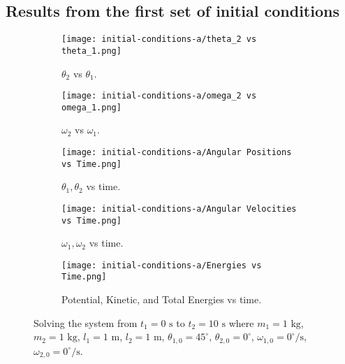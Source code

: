 \subsection{Results from the first set of initial conditions}\label{subsec:results-from-the-first-set-of-initial-conditions}
\begin{figure}[H]
    \centering
    \begin{subfigure}[b]{0.49\textwidth}
        \centering
        \texttt{[image: initial-conditions-a/theta\_2 vs theta\_1.png]}
        \caption{$\theta_2$ vs $\theta_1$.}
        \label{fig:2a}
    \end{subfigure}
    \hfill
    \begin{subfigure}[b]{0.49\textwidth}
        \centering
        \texttt{[image: initial-conditions-a/omega\_2 vs omega\_1.png]}
        \caption{$\omega_2$ vs $\omega_1$.}
        \label{fig:2b}
    \end{subfigure}
    \hfill
    \begin{subfigure}[b]{0.49\textwidth}
        \centering
        \texttt{[image: initial-conditions-a/Angular Positions vs Time.png]}
        \caption{$\theta_1, \theta_2$ vs time.}
        \label{fig:2c}
    \end{subfigure}
    \hfill
    \begin{subfigure}[b]{0.49\textwidth}
        \centering
        \texttt{[image: initial-conditions-a/Angular Velocities vs Time.png]}
        \caption{$\omega_1, \omega_2$ vs time.}
        \label{fig:2d}
    \end{subfigure}
    \hfill
    \begin{subfigure}[b]{0.49\textwidth}
        \centering
        \texttt{[image: initial-conditions-a/Energies vs Time.png]}
        \caption{Potential, Kinetic, and Total Energies vs time.}
        \label{fig:2e}
    \end{subfigure}
    \caption{Solving the system from $t_1 = 0\text{ s}$ to $t_2 = 10\text{ s}$ where $m_1 = 1\text{ kg}$, $m_2 = 1\text{ kg}$, $l_1 = 1\text{ m}$, $l_2 = 1\text{ m}$, $\theta_{1,0} = 45^\circ$, $\theta_{2,0} = 0^\circ$, $\omega_{1,0} = 0^\circ\text{/s}$, $\omega_{2,0} = 0^\circ\text{/s}$.}
    \label{fig:2}
\end{figure}

